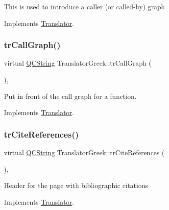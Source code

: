 This is used to introduce a caller (or called-\/by) graph 

Implements \mbox{\hyperlink{class_translator}{Translator}}.

\mbox{\label{class_translator_greek_af0054eed6fe9bc9b1ce396b013510c99}} 
\subsubsection{\texorpdfstring{trCallGraph()}{trCallGraph()}}
{\footnotesize\ttfamily virtual \mbox{\hyperlink{class_q_c_string}{Q\+C\+String}} Translator\+Greek\+::tr\+Call\+Graph (\begin{DoxyParamCaption}{ }\end{DoxyParamCaption})\hspace{0.3cm}{\ttfamily [inline]}, {\ttfamily [virtual]}}

Put in front of the call graph for a function. 

Implements \mbox{\hyperlink{class_translator}{Translator}}.

\mbox{\label{class_translator_greek_a54adea7d74a346cd8e75bca56cba492f}} 
\subsubsection{\texorpdfstring{trCiteReferences()}{trCiteReferences()}}
{\footnotesize\ttfamily virtual \mbox{\hyperlink{class_q_c_string}{Q\+C\+String}} Translator\+Greek\+::tr\+Cite\+References (\begin{DoxyParamCaption}{ }\end{DoxyParamCaption})\hspace{0.3cm}{\ttfamily [inline]}, {\ttfamily [virtual]}}

Header for the page with bibliographic citations 

Implements \mbox{\hyperlink{class_translator}{Translator}}.

\mbox{\label{class_translator_greek_af7ebcac7b128a0f2b6b2cebdf92e982a}} 

